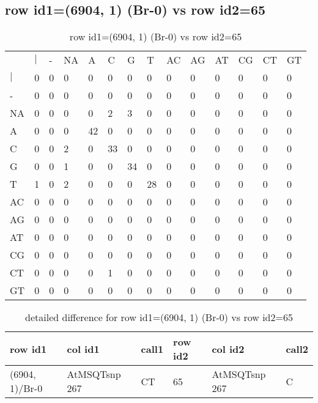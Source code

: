 \subsection{row id1=(6904, 1) (Br-0) vs row id2=65}
\begin{center}
\begin{longtable}{|l|l|l|l|l|l|l|l|l|l|l|l|l|l|}
\caption{row id1=(6904, 1) (Br-0) vs row id2=65} \label{table_dm74}\\
\hline
\\
\hline
&$|$&-&NA&A&C&G&T&AC&AG&AT&CG&CT&GT\\
$|$&0&0&0&0&0&0&0&0&0&0&0&0&0\\
-&0&0&0&0&0&0&0&0&0&0&0&0&0\\
NA&0&0&0&0&2&3&0&0&0&0&0&0&0\\
A&0&0&0&42&0&0&0&0&0&0&0&0&0\\
C&0&0&2&0&33&0&0&0&0&0&0&0&0\\
G&0&0&1&0&0&34&0&0&0&0&0&0&0\\
T&1&0&2&0&0&0&28&0&0&0&0&0&0\\
AC&0&0&0&0&0&0&0&0&0&0&0&0&0\\
AG&0&0&0&0&0&0&0&0&0&0&0&0&0\\
AT&0&0&0&0&0&0&0&0&0&0&0&0&0\\
CG&0&0&0&0&0&0&0&0&0&0&0&0&0\\
CT&0&0&0&0&1&0&0&0&0&0&0&0&0\\
GT&0&0&0&0&0&0&0&0&0&0&0&0&0\\
\hline
\end{longtable}
\end{center}

\begin{center}
\begin{longtable}{|l|l|l|l|l|l|}
\caption{detailed difference for row id1=(6904, 1) (Br-0) vs row id2=65} \label{table_dm75}\\
\hline
row id1&col id1&call1&row id2&col id2&call2\\
\hline
(6904, 1)/Br-0&AtMSQTsnp 267&CT&65&AtMSQTsnp 267&C\\
\hline
\end{longtable}
\end{center}

